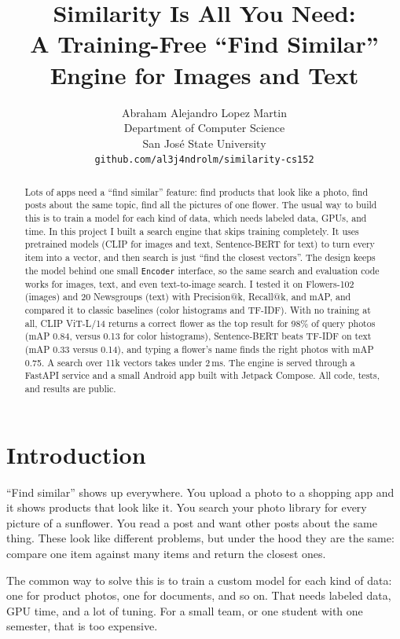 \documentclass{article}
\title{Similarity Is All You Need:\\ A Training-Free ``Find Similar'' Engine for Images and Text}
\author{%
  Abraham Alejandro Lopez Martin \\
  Department of Computer Science\\
  San Jos\'e State University\\
  \texttt{github.com/al3j4ndrolm/similarity-cs152}
}
\begin{document}
\maketitle

\begin{abstract}
Lots of apps need a ``find similar'' feature: find products that look like a photo, find posts about the same topic, find all the pictures of one flower. The usual way to build this is to train a model for each kind of data, which needs labeled data, GPUs, and time. In this project I built a search engine that skips training completely. It uses pretrained models (CLIP for images and text, Sentence-BERT for text) to turn every item into a vector, and then search is just ``find the closest vectors''. The design keeps the model behind one small \texttt{Encoder} interface, so the same search and evaluation code works for images, text, and even text-to-image search. I tested it on Flowers-102 (images) and 20 Newsgroups (text) with Precision@k, Recall@k, and mAP, and compared it to classic baselines (color histograms and TF-IDF). With no training at all, CLIP ViT-L/14 returns a correct flower as the top result for 98\% of query photos (mAP 0.84, versus 0.13 for color histograms), Sentence-BERT beats TF-IDF on text (mAP 0.33 versus 0.14), and typing a flower's name finds the right photos with mAP 0.75. A search over 11k vectors takes under 2\,ms. The engine is served through a FastAPI service and a small Android app built with Jetpack Compose. All code, tests, and results are public.
\end{abstract}

\section{Introduction}

``Find similar'' shows up everywhere. You upload a photo to a shopping app and it shows products that look like it. You search your photo library for every picture of a sunflower. You read a post and want other posts about the same thing. These look like different problems, but under the hood they are the same: compare one item against many items and return the closest ones.

The common way to solve this is to train a custom model for each kind of data: one for product photos, one for documents, and so on. That needs labeled data, GPU time, and a lot of tuning. For a small team, or one student with one semester, that is too expensive.
\end{document}
